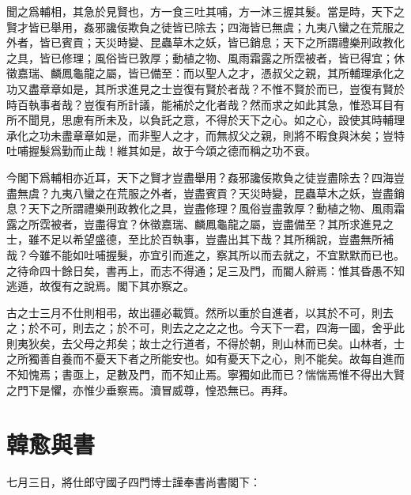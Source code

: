 聞之爲輔相，其急於見賢也，方一食三吐其哺，方一沐三握其髮。當是時，天下之賢才皆已舉用，姦邪讒佞欺負之徒皆已除去；四海皆已無虞；九夷八蠻之在荒服之外者，皆已賓貢；天災時變、昆蟲草木之妖，皆已銷息；天下之所謂禮樂刑政教化之具，皆已修理；風俗皆已敦厚；動植之物、風雨霜露之所霑被者，皆已得宜；休徵嘉瑞、麟鳳龜龍之屬，皆已備至：而以聖人之才，憑叔父之親，其所輔理承化之功又盡章章如是，其所求進見之士豈復有賢於者哉？不惟不賢於而已，豈復有賢於時百執事者哉？豈復有所計議，能補於之化者哉？然而求之如此其急，惟恐耳目有所不聞見，思慮有所未及，以負託之意，不得於天下之心。如之心，設使其時輔理承化之功未盡章章如是，而非聖人之才，而無叔父之親，則將不暇食與沐矣；豈特吐哺握髮爲勤而止哉！維其如是，故于今頌之德而稱之功不衰。

今閣下爲輔相亦近耳，天下之賢才豈盡舉用？姦邪讒佞欺負之徒豈盡除去？四海豈盡無虞？九夷八蠻之在荒服之外者，豈盡賓貢？天災時變，昆蟲草木之妖，豈盡銷息？天下之所謂禮樂刑政教化之具，豈盡修理？風俗豈盡敦厚？動植之物、風雨霜露之所霑被者，豈盡得宜？休徵嘉瑞、麟鳳龜龍之屬，豈盡備至？其所求進見之士，雖不足以希望盛德，至比於百執事，豈盡出其下哉？其所稱說，豈盡無所補哉？今雖不能如吐哺握髮，亦宜引而進之，察其所以而去就之，不宜默默而已也。之待命四十餘日矣，書再上，而志不得通；足三及門，而閽人辭焉：惟其昏愚不知逃遁，故復有之說焉。閣下其亦察之。

古之士三月不仕則相弔，故出疆必載質。然所以重於自進者，以其於不可，則去之；於不可，則去之；於不可，則去之之之之也。今天下一君，四海一國，舍乎此則夷狄矣，去父母之邦矣；故士之行道者，不得於朝，則山林而已矣。山林者，士之所獨善自養而不憂天下者之所能安也。如有憂天下之心，則不能矣。故每自進而不知愧焉；書亟上，足數及門，而不知止焉。寧獨如此而已？惴惴焉惟不得出大賢之門下是懼，亦惟少垂察焉。瀆冒威尊，惶恐無已。再拜。

\section[與于襄陽書\quad{\small 韓愈}]{{\normalsize 韓愈}\quad 與書}
{\parindent=0pt 七月三日，將仕郎守國子四門博士謹奉書尚書閣下：}

